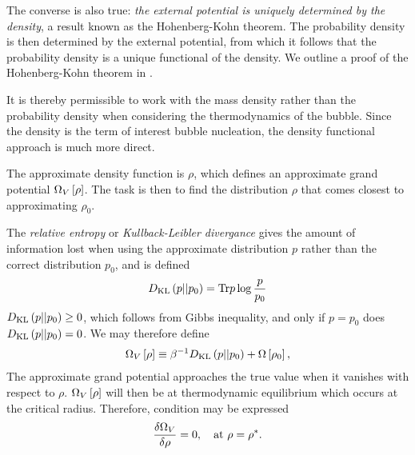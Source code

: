  The converse is also true:
 {\em the external potential is uniquely determined by the density},
 a result known as the Hohenberg-Kohn theorem.
 The probability density is then determined by the external potential,
 from which it follows that the probability density is a unique functional of the density.
 We outline a proof of the Hohenberg-Kohn theorem in .
 

It is thereby permissible to work with the mass density rather than the probability density when considering the thermodynamics of the bubble.
Since the density is the term of interest bubble nucleation, the density functional approach is much more direct.



%
The approximate density function is $\rho$, which defines an approximate grand potential $\Omega_V\left[ \rho \right]$.
The task is then to find the distribution $\rho$ that comes closest to approximating $\rho_0$.

The {\em relative entropy } or {\em Kullback-Leibler divergance} gives the amount of information lost 
when using the approximate distribution  $p$ rather than the correct distribution $p_0$,
and is defined
\begin{align}
  D_{\text {KL}}\left( {p}||{p_0} \right) = \textrm{Tr} p \log \frac{p}{p_0} \label{eqn:nuc:KLD}
\end{align}
$D_{\text {KL}}\left( {p}||{p_0} \right) \ge 0$, which follows from Gibbs inequality, and only if $p=p_0$ does $D_{\text {KL}}\left( {p}||{p_0} \right) = 0$.
We may therefore define
\begin{align}
 \Omega_V\left[ \rho \right] \equiv \beta^{-1}D_{\text {KL}}\left( {p}||{p_0} \right)+   \Omega\left[ \rho_0 \right], 
\end{align}
The approximate  grand potential approaches the true value when 
it vanishes  with respect to $\rho$.
 $\Omega_V\left[ \rho \right] $ will then be at thermodynamic equilibrium
which occurs at the critical radius.
Therefore,
condition \eqnref{}
may be expressed\cite{Oxtoby1992}
\begin{align}
  \frac{\delta \Omega_V}{\delta \rho} =0,\quad\text{at $\rho = {\rho^\ast}$.} \label{eqn:DFT:astar}
\end{align}

